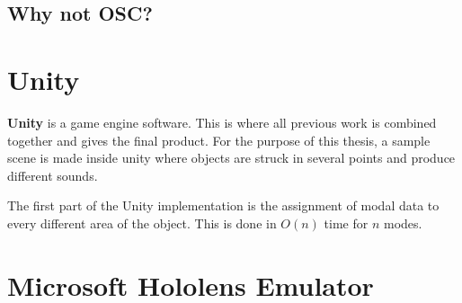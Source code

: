 \subsection{Why not OSC?}

\section{Unity\textregistered}
\textbf{Unity\textregistered} is a game engine software. This is where all previous work is combined together and gives the final product. For the purpose of this thesis, a sample scene is made inside unity where objects are struck in several points and produce different sounds. 

The first part of the Unity implementation is the assignment of modal data to every different area of the object. This is done in $O(n)$ time for $n$ modes. 


\section{Microsoft Hololens Emulator}

